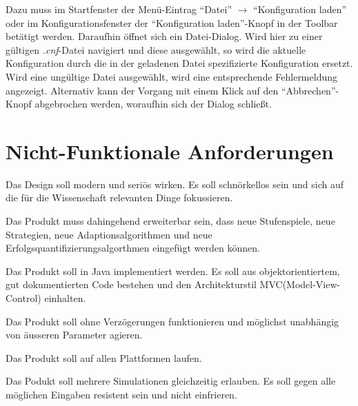 \documentclass[parskip=full,11pt]{scrartcl}
\begin{document}
Dazu muss im Startfenster der Menü-Eintrag \enquote{Datei} \(\rightarrow\) \enquote{Konfiguration laden} oder im Konfigurationsfenster der \enquote{Konfiguration laden}-Knopf in der Toolbar betätigt werden. Daraufhin öffnet sich ein Datei-Dialog. Wird hier zu einer gültigen \textit{.cnf}-Datei navigiert und diese ausgewählt, so wird die aktuelle Konfiguration durch die in der geladenen Datei spezifizierte Konfiguration ersetzt. Wird eine ungültige Datei ausgewählt, wird eine entsprechende Fehlermeldung angezeigt. Alternativ kann der Vorgang mit einem Klick auf den \enquote{Abbrechen}-Knopf abgebrochen werden, woraufhin sich der Dialog schließt.

\section{Nicht-Funktionale Anforderungen}


Das Design soll modern und seriös wirken. Es soll schnörkellos sein und sich auf die für die Wissenschaft relevanten Dinge fokussieren.


Das Produkt muss dahingehend erweiterbar sein,
dass neue Stufenspiele, neue Strategien, neue Adaptionsalgorithmen und neue Erfolgsquantifizierungsalgorthmen eingefügt werden können.


Das Produkt soll in Java implementiert werden. Es soll aus objektorientiertem, gut dokumentierten Code bestehen und den Architekturstil MVC(Model-View-Control) einhalten.


Das Produkt soll ohne Verzögerungen funktionieren und möglichst unabhängig von äusseren Parameter agieren.


Das Produkt soll auf allen Plattformen laufen.


Das Podukt soll mehrere Simulationen gleichzeitig erlauben. Es soll gegen alle möglichen Eingaben resistent sein und nicht einfrieren.

\end{document}
